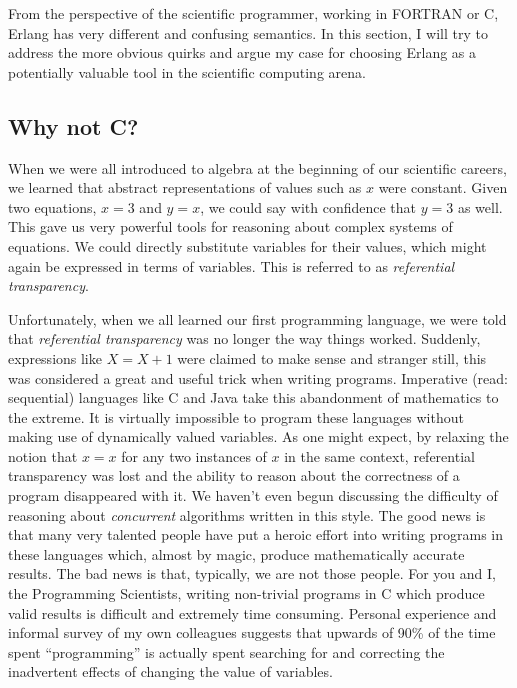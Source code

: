 \documentclass[twocolumn,a4paper,10pt]{article}
\begin{document}
From the perspective of the scientific programmer, working in FORTRAN or C,
Erlang has very different and confusing semantics. In this section, I will try
to address the more obvious quirks and argue my case for choosing Erlang as a
potentially valuable tool in the scientific computing arena.

\subsection{Why not C?}

When we were all introduced to algebra at the beginning of our scientific
careers, we learned that abstract representations of values such as $x$ were
constant. Given two equations, $x = 3$ and $y = x$, we could say with confidence
that $y = 3$ as well. This gave us very powerful tools for reasoning about
complex systems of equations. We could directly substitute variables for their
values, which might again be expressed in terms of variables. This is referred
to as \emph{referential transparency}.

Unfortunately, when we all learned our first programming language, we were told
that \emph{referential transparency} was no longer the way things worked.
Suddenly, expressions like $X = X + 1$ were claimed to make sense and stranger
still, this was considered a great and useful trick when writing programs.
Imperative (read: sequential) languages like C and Java take this abandonment of
mathematics to the extreme. It is virtually impossible to program these
languages without making use of dynamically valued variables. As one might
expect, by relaxing the notion that $x = x$ for any two instances of $x$ in the
same context, referential transparency was lost and the ability to reason about
the correctness of a program disappeared with it. We haven't even begun
discussing the difficulty of reasoning about \emph{concurrent} algorithms
written in this style. The good news is that many very talented people have put
a heroic effort into writing programs in these languages which, almost by magic,
produce mathematically accurate results. The bad news is that, typically, we are
not those people. For you and I, the Programming Scientists, writing non-trivial
programs in C which produce valid results is difficult and extremely time
consuming. Personal experience and informal survey of my own colleagues suggests
that upwards of 90\% of the time spent ``programming'' is actually spent
searching for and correcting the inadvertent effects of changing the value of
variables.
\end{document}
